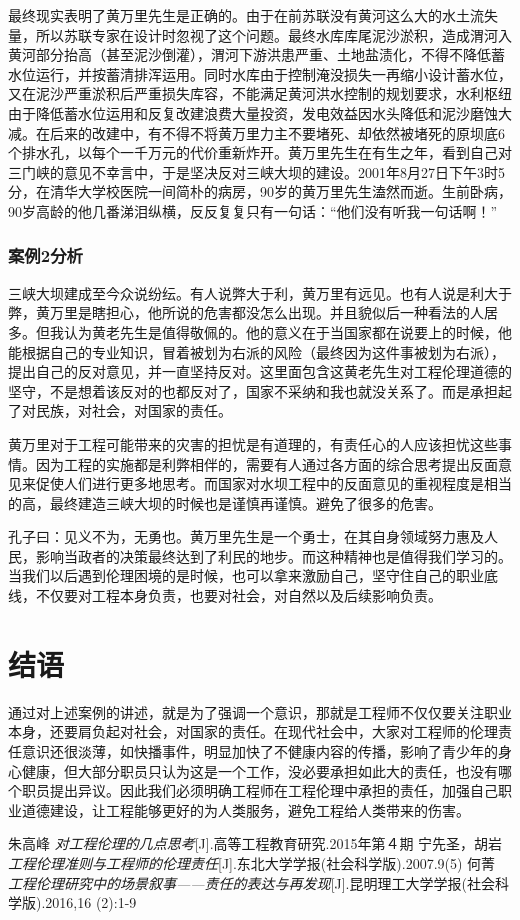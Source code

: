 \documentclass[a4paper,12pt]{ctexart}
\begin{document}
最终现实表明了黄万里先生是正确的。由于在前苏联没有黄河这么大的水土流失量，所以苏联专家在设计时忽视了这个问题。最终水库库尾泥沙淤积，造成渭河入黄河部分抬高（甚至泥沙倒灌），渭河下游洪患严重、土地盐渍化，不得不降低蓄水位运行，并按蓄清排浑运用。同时水库由于控制淹没损失一再缩小设计蓄水位，又在泥沙严重淤积后严重损失库容，不能满足黄河洪水控制的规划要求，水利枢纽由于降低蓄水位运用和反复改建浪费大量投资，发电效益因水头降低和泥沙磨蚀大减。在后来的改建中，有不得不将黄万里力主不要堵死、却依然被堵死的原坝底6个排水孔，以每个一千万元的代价重新炸开。黄万里先生在有生之年，看到自己对三门峡的意见不幸言中，于是坚决反对三峡大坝的建设。2001年8月27日下午3时5分，在清华大学校医院一间简朴的病房，90岁的黄万里先生溘然而逝。生前卧病，90岁高龄的他几番涕泪纵横，反反复复只有一句话：“他们没有听我一句话啊！”

\subsubsection{案例2分析}
三峡大坝建成至今众说纷纭。有人说弊大于利，黄万里有远见。也有人说是利大于弊，黄万里是瞎担心，他所说的危害都没怎么出现。并且貌似后一种看法的人居多。但我认为黄老先生是值得敬佩的。他的意义在于当国家都在说要上的时候，他能根据自己的专业知识，冒着被划为右派的风险（最终因为这件事被划为右派），提出自己的反对意见，并一直坚持反对。这里面包含这黄老先生对工程伦理道德的坚守，不是想着该反对的也都反对了，国家不采纳和我也就没关系了。而是承担起了对民族，对社会，对国家的责任。

黄万里对于工程可能带来的灾害的担忧是有道理的，有责任心的人应该担忧这些事情。因为工程的实施都是利弊相伴的，需要有人通过各方面的综合思考提出反面意见来促使人们进行更多地思考。而国家对水坝工程中的反面意见的重视程度是相当的高，最终建造三峡大坝的时候也是谨慎再谨慎。避免了很多的危害。

孔子曰：见义不为，无勇也。黄万里先生是一个勇士，在其自身领域努力惠及人民，影响当政者的决策最终达到了利民的地步。而这种精神也是值得我们学习的。当我们以后遇到伦理困境的是时候，也可以拿来激励自己，坚守住自己的职业底线，不仅要对工程本身负责，也要对社会，对自然以及后续影响负责。



\section{结语}

通过对上述案例的讲述，就是为了强调一个意识，那就是工程师不仅仅要关注职业本身，还要肩负起对社会，对国家的责任。在现代社会中，大家对工程师的伦理责任意识还很淡薄，如快播事件，明显加快了不健康内容的传播，影响了青少年的身心健康，但大部分职员只认为这是一个工作，没必要承担如此大的责任，也没有哪个职员提出异议。因此我们必须明确工程师在工程伦理中承担的责任，加强自己职业道德建设，让工程能够更好的为人类服务，避免工程给人类带来的伤害。

\begin{thebibliography}{99}

朱高峰 \emph{对工程伦理的几点思考}[J].高等工程教育研究.2015年第４期
  宁先圣，胡岩 \emph{工程伦理准则与工程师的伦理责任}[J].东北大学学报(社会科学版).2007.9(5)
  何菁 \emph{工程伦理研究中的场景叙事——责任的表达与再发现}[J].昆明理工大学学报(社会科学版).2016,16 (2):1-9
\end{thebibliography}
\end{document}

